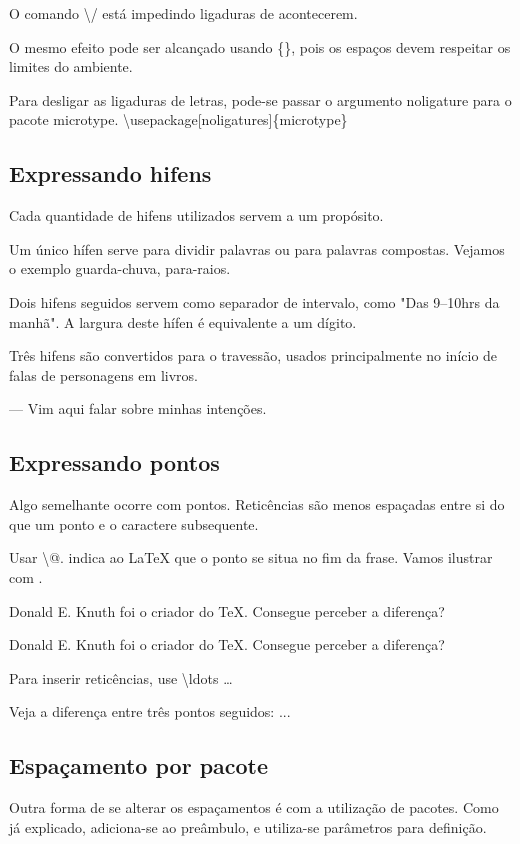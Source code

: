 O comando \textbackslash/ está impedindo ligaduras de acontecerem.

O mesmo efeito pode ser alcançado usando \{\},
pois os espaços devem respeitar os limites do ambiente.

Para desligar as ligaduras de letras, pode-se passar o argumento noligature para o pacote microtype.
\textbackslash usepackage[noligatures]\{microtype\}

\subsection{Expressando hifens}
Cada quantidade de hifens utilizados servem a um propósito.

Um único hífen serve para dividir palavras ou para palavras compostas.
Vejamos o exemplo guarda-chuva, para-raios.

Dois hifens seguidos servem como separador de intervalo, como
"Das 9--10hrs da manhã".
A largura deste hífen é equivalente a um dígito.


Três hifens são convertidos para o travessão, usados principalmente no início de falas de personagens em livros.

--- Vim aqui falar sobre minhas intenções.

\subsection{Expressando pontos}
Algo semelhante ocorre com pontos.
Reticências são menos espaçadas entre si do que um ponto 
e o caractere subsequente.

Usar \textbackslash @. indica ao LaTeX que o ponto se situa no fim da frase.
Vamos ilustrar com \@.

Donald E. Knuth foi o criador do \TeX. Consegue perceber a diferença?

Donald E. Knuth foi o criador do \TeX\@. Consegue perceber a diferença?

Para inserir reticências, use \textbackslash ldots \ldots

Veja a diferença entre três pontos seguidos: ...

\subsection{Espaçamento por pacote}
Outra forma de se alterar os espaçamentos é com a utilização de pacotes.
Como já explicado, adiciona-se ao preâmbulo, e utiliza-se parâmetros para definição.

